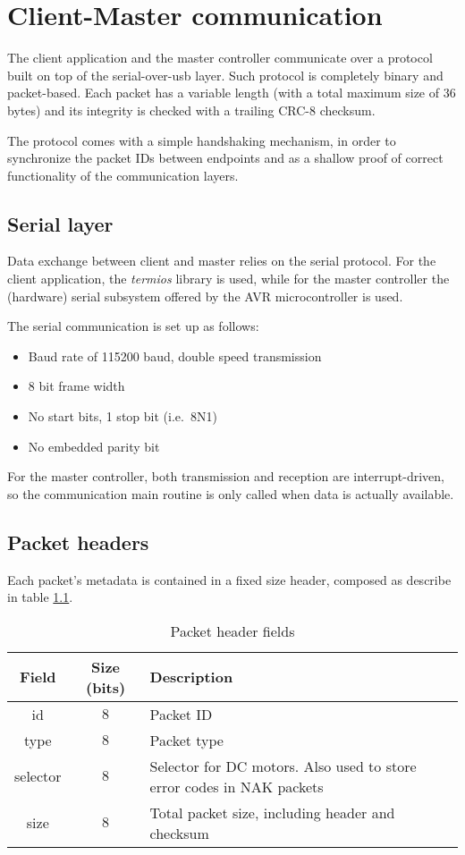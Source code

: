 \chapter{Client-Master communication}
\label{ch:client-master-comm}
The client application and the master controller communicate over a protocol
built on top of the serial-over-usb layer. Such protocol is completely binary
and packet-based. Each packet has a variable length (with a total maximum size
of 36 bytes) and its integrity is checked with a trailing CRC-8 checksum.

The protocol comes with a simple handshaking mechanism, in order to synchronize
the packet IDs between endpoints and as a shallow proof of correct
functionality of the communication layers.

\section{Serial layer}
Data exchange between client and master relies on the serial protocol. For the
client application, the \emph{termios} library is used, while for the master
controller the (hardware) serial subsystem offered by the AVR
microcontroller\cite{at2560-ref} is used.

The serial communication is set up as follows:
\begin{itemize}
  \item Baud rate of 115200 baud, double speed transmission
  \item 8 bit frame width
  \item No start bits, 1 stop bit (i.e.\ 8N1)
  \item No embedded parity bit
\end{itemize}

For the master controller, both transmission and reception are
interrupt-driven, so the communication main routine is only called when data is
actually available.

\section{Packet headers}
Each packet's metadata is contained in a fixed size header, composed as
describe in table \ref{tab:packet-header}.

\begin{table}[bh]
  \begin{tabularx}{\textwidth}{c c X}
    \toprule
    Field & Size (bits) & Description \\
    \midrule
    id       & $8$ & Packet ID \\
    type     & $8$ & Packet type \\
    selector & $8$ & Selector for DC motors. Also used to store error codes in NAK packets \\
    size     & $8$ & Total packet size, including header and checksum \\
    \bottomrule
  \end{tabularx}
  \caption{Packet header fields}
  \label{tab:packet-header}
\end{table}

